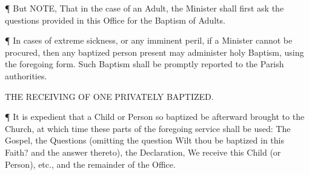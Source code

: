 ¶ But NOTE, That in the case of an Adult, the Minister shall first ask the questions provided in this Office for the Baptism of Adults.

¶ In cases of extreme sickness, or any imminent peril, if a Minister cannot be procured, then any baptized person present may administer holy Baptism, using the foregoing form. Such Baptism shall be promptly reported to the Parish authorities.

 

THE RECEIVING OF ONE PRIVATELY BAPTIZED. 

 
¶ It is expedient that a Child or Person so baptized be afterward brought to the Church, at which time these parts of the foregoing service shall be used: 
    The Gospel, the Questions (omitting the question Wilt thou be baptized in this Faith? and the answer thereto), the Declaration, We receive this Child (or Person), etc., and the remainder of the Office.
 
